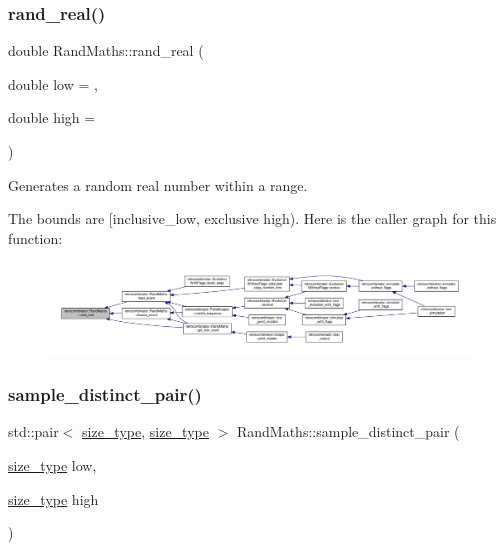\subsubsection{\texorpdfstring{rand\+\_\+real()}{rand\_real()}}
{\footnotesize\ttfamily double Rand\+Maths\+::rand\+\_\+real (\begin{DoxyParamCaption}\item[{double}]{low = {},  }\item[{double}]{high = {} }\end{DoxyParamCaption})}



Generates a random real number within a range. 

The bounds are \mbox{[}inclusive\+\_\+low, exclusive high). Here is the caller graph for this function\+:
\nopagebreak
\begin{figure}[H]
\begin{center}
\leavevmode
\includegraphics[width=350pt]{classretrocombinator_1_1RandMaths_aa6441baa59bff50f588c0c54e3c54140_icgraph}
\end{center}
\end{figure}
\mbox{\label{classretrocombinator_1_1RandMaths_a2758ba7c9818bc664c4b751a697e1fe6}} 
\subsubsection{\texorpdfstring{sample\+\_\+distinct\+\_\+pair()}{sample\_distinct\_pair()}}
{\footnotesize\ttfamily std\+::pair$<$ \hyperlink{namespaceretrocombinator_a8e1541b50cee66a791df4c437ccbb385}{size\+\_\+type}, \hyperlink{namespaceretrocombinator_a8e1541b50cee66a791df4c437ccbb385}{size\+\_\+type} $>$ Rand\+Maths\+::sample\+\_\+distinct\+\_\+pair (\begin{DoxyParamCaption}\item[{\hyperlink{namespaceretrocombinator_a8e1541b50cee66a791df4c437ccbb385}{size\+\_\+type}}]{low,  }\item[{\hyperlink{namespaceretrocombinator_a8e1541b50cee66a791df4c437ccbb385}{size\+\_\+type}}]{high }\end{DoxyParamCaption})}



